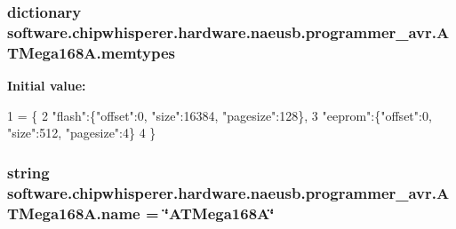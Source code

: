 \subsubsection[{memtypes}]{\setlength{\rightskip}{0pt plus 5cm}dictionary software.\+chipwhisperer.\+hardware.\+naeusb.\+programmer\+\_\+avr.\+A\+T\+Mega168\+A.\+memtypes\hspace{0.3cm}{\ttfamily [static]}}\label{classsoftware_1_1chipwhisperer_1_1hardware_1_1naeusb_1_1programmer__avr_1_1ATMega168A_af0fcafa37181966de56affefb138dc4e}
{\bfseries Initial value\+:}
\begin{DoxyCode}
1 = \{
2        \textcolor{stringliteral}{"flash"}:\{\textcolor{stringliteral}{"offset"}:0, \textcolor{stringliteral}{"size"}:16384, \textcolor{stringliteral}{"pagesize"}:128\},
3        \textcolor{stringliteral}{"eeprom"}:\{\textcolor{stringliteral}{"offset"}:0, \textcolor{stringliteral}{"size"}:512, \textcolor{stringliteral}{"pagesize"}:4\}
4      \}
\end{DoxyCode}
\hypertarget{classsoftware_1_1chipwhisperer_1_1hardware_1_1naeusb_1_1programmer__avr_1_1ATMega168A_a04624fef915ec8416fb29de5e7fb5ddb}{}
\subsubsection[{name}]{\setlength{\rightskip}{0pt plus 5cm}string software.\+chipwhisperer.\+hardware.\+naeusb.\+programmer\+\_\+avr.\+A\+T\+Mega168\+A.\+name = \char`\"{}A\+T\+Mega168\+A\char`\"{}\hspace{0.3cm}{\ttfamily [static]}}\label{classsoftware_1_1chipwhisperer_1_1hardware_1_1naeusb_1_1programmer__avr_1_1ATMega168A_a04624fef915ec8416fb29de5e7fb5ddb}
\hypertarget{classsoftware_1_1chipwhisperer_1_1hardware_1_1naeusb_1_1programmer__avr_1_1ATMega168A_a5beeac27a331578ef4fb6f6c54d17add}{}
